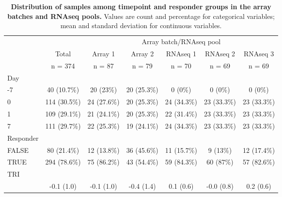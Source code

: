 \begin{table}[] 
 \centering 
 \caption{\textbf{Distribution of samples among timepoint and responder groups in the array batches and \gls{RNAseq} pools.} Values are count and percentage for categorical variables; mean and standard deviation for continuous variables.}\label{tab:hird_batch_balance}
 \begin{tabular}{ l c c c c c c }
 \toprule
  &   &  \multicolumn{ 5 }{c}{ Array batch/\gls{RNAseq} pool }\\ 
  & Total & Array 1 & Array 2 & \gls{RNAseq} 1 & \gls{RNAseq} 2 & \gls{RNAseq} 3\\ 
  & n = 374 & n = 87 & n = 79 & n = 70 & n = 69 & n = 69 \\ 
  \midrule
 Day &   &   &   &   &   &  \\ 
 \hspace{6pt}    -7 & 40 (10.7\%) & 20 (23\%) & 20 (25.3\%) & 0 (0\%) & 0 (0\%) & 0 (0\%)\\ 
 \hspace{6pt}    0 & 114 (30.5\%) & 24 (27.6\%) & 20 (25.3\%) & 24 (34.3\%) & 23 (33.3\%) & 23 (33.3\%)\\ 
 \hspace{6pt}    1 & 109 (29.1\%) & 21 (24.1\%) & 20 (25.3\%) & 22 (31.4\%) & 23 (33.3\%) & 23 (33.3\%)\\ 
 \hspace{6pt}    7 & 111 (29.7\%) & 22 (25.3\%) & 19 (24.1\%) & 24 (34.3\%) & 23 (33.3\%) & 23 (33.3\%)\\ 
 Responder &   &   &   &   &   &  \\ 
 \hspace{6pt}    FALSE & 80 (21.4\%) & 12 (13.8\%) & 36 (45.6\%) & 11 (15.7\%) & 9 (13\%) & 12 (17.4\%)\\ 
 \hspace{6pt}    TRUE & 294 (78.6\%) & 75 (86.2\%) & 43 (54.4\%) & 59 (84.3\%) & 60 (87\%) & 57 (82.6\%)\\ 
 TRI &   &   &   &   &   &  \\ 
 \hspace{6pt}   & -0.1 (1.0) & -0.1 (1.0) & -0.4 (1.4) & 0.1 (0.6) & -0.0 (0.8) & 0.2 (0.6)\\ 
 \bottomrule
 
 \end{tabular}
 \end{table}
